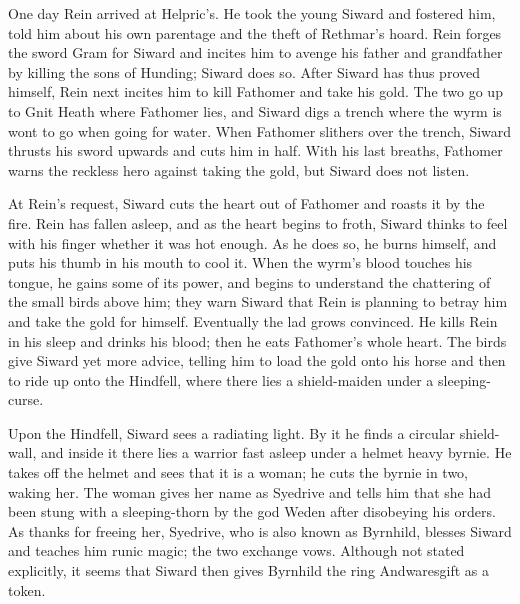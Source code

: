 One day Rein arrived at Helpric’s.  He took the young Siward and fostered him, told him about his own parentage and the theft of Rethmar’s hoard.  Rein forges the sword Gram for Siward and incites him to avenge his father and grandfather by killing the sons of Hunding; Siward does so.  After Siward has thus proved himself, Rein next incites him to kill Fathomer and take his gold.  The two go up to Gnit Heath where Fathomer lies, and Siward digs a trench where the wyrm is wont to go when going for water.  When Fathomer slithers over the trench, Siward thrusts his sword upwards and cuts him in half.  With his last breaths, Fathomer warns the reckless hero against taking the gold, but Siward does not listen.

At Rein’s request, Siward cuts the heart out of Fathomer and roasts it by the fire.  Rein has fallen asleep, and as the heart begins to froth, Siward thinks to feel with his finger whether it was hot enough.  As he does so, he burns himself, and puts his thumb in his mouth to cool it.  When the wyrm’s blood touches his tongue, he gains some of its power, and begins to understand the chattering of the small birds above him; they warn Siward that Rein is planning to betray him and take the gold for himself.  Eventually the lad grows convinced.  He kills Rein in his sleep and drinks his blood; then he eats Fathomer’s whole heart.  The birds give Siward yet more advice, telling him to load the gold onto his horse and then to ride up onto the Hindfell, where there lies a shield-maiden under a sleeping-curse.

Upon the Hindfell, Siward sees a radiating light.  By it he finds a circular shield-wall, and inside it there lies a warrior fast asleep under a helmet heavy byrnie.  He takes off the helmet and sees that it is a woman; he cuts the byrnie in two, waking her.  The woman gives her name as Syedrive and tells him that she had been stung with a sleeping-thorn by the god Weden after disobeying his orders.  As thanks for freeing her, Syedrive, who is also known as Byrnhild, blesses Siward and teaches him runic magic; the two exchange vows.  Although not stated explicitly, it seems that Siward then gives Byrnhild the ring Andwaresgift as a token.

